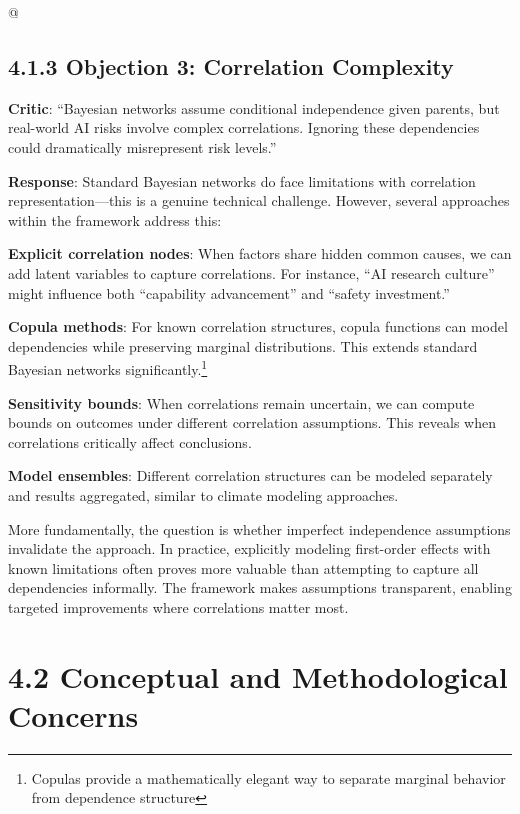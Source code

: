 \documentclass[
  11pt,
  letterpaper,
]{book}
\begin{document}
@\textcite{lindley2013}

\subsection*{4.1.3 Objection 3: Correlation
Complexity}\label{sec-correlation-complexity}

\textbf{Critic}: ``Bayesian networks assume conditional independence
given parents, but real-world AI risks involve complex correlations.
Ignoring these dependencies could dramatically misrepresent risk
levels.''

\textbf{Response}: Standard Bayesian networks do face limitations with
correlation representation---this is a genuine technical challenge.
However, several approaches within the framework address this:

\textbf{Explicit correlation nodes}: When factors share hidden common
causes, we can add latent variables to capture correlations. For
instance, ``AI research culture'' might influence both ``capability
advancement'' and ``safety investment.''

\textbf{Copula methods}: For known correlation structures, copula
functions can model dependencies while preserving marginal
distributions. This extends standard Bayesian networks
significantly.\footnote{Copulas provide a mathematically elegant way to
  separate marginal behavior from dependence structure}

\textcite{nelson2006}

\textbf{Sensitivity bounds}: When correlations remain uncertain, we can
compute bounds on outcomes under different correlation assumptions. This
reveals when correlations critically affect conclusions.

\textbf{Model ensembles}: Different correlation structures can be
modeled separately and results aggregated, similar to climate modeling
approaches.

More fundamentally, the question is whether imperfect independence
assumptions invalidate the approach. In practice, explicitly modeling
first-order effects with known limitations often proves more valuable
than attempting to capture all dependencies informally. The framework
makes assumptions transparent, enabling targeted improvements where
correlations matter most.

\section*{4.2 Conceptual and Methodological
Concerns}\label{sec-conceptual-concerns}
\end{document}
